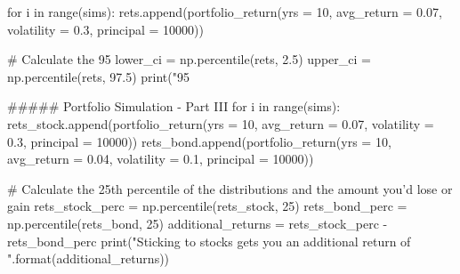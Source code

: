 for i in range(sims):
    rets.append(portfolio_return(yrs = 10, avg_return = 0.07, 
                                 volatility = 0.3, principal = 10000))

# Calculate the 95%
lower_ci = np.percentile(rets, 2.5) 
upper_ci = np.percentile(rets, 97.5)
print("95%

##### Portfolio Simulation - Part III
for i in range(sims):
    rets_stock.append(portfolio_return(yrs = 10, avg_return = 0.07, volatility = 0.3, principal = 10000))
    rets_bond.append(portfolio_return(yrs = 10, avg_return = 0.04, volatility = 0.1, principal = 10000))

# Calculate the 25th percentile of the distributions and the amount you'd lose or gain
rets_stock_perc = np.percentile(rets_stock, 25)
rets_bond_perc = np.percentile(rets_bond, 25)
additional_returns = rets_stock_perc - rets_bond_perc
print("Sticking to stocks gets you an additional return of {}".format(additional_returns))

